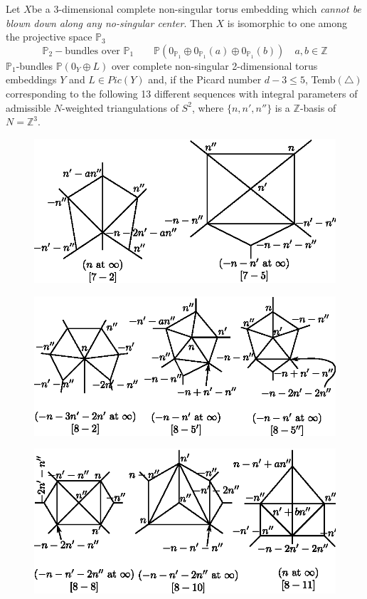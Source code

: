 \setcounter{theorem}{5}
\begin{theorem}\label{chap1:thm9.6}
Let $X$\pageoriginale be a 3-dimensional complete non-singular torus
embedding which \textit{cannot be blown down along any no-singular
  center}. Then $X$ is isomorphic to one among the projective space
$\mathbb{P}_3$  
$$
\mathbb{P}_2-\text{bundles over } \mathbb{P}_1 \qquad
\mathbb{P}(0_{\mathbb{P}_1} \oplus 0_{\mathbb{P}_1} (a) \oplus
0_{\mathbb{P}_1} (b))\quad a, b \in \mathbb{Z}
$$
$\mathbb{P}_1$-bundles
$\mathbb{P}(0_Y \oplus L)$ over complete non-singular 2-dimensional
torus embeddings $Y$ and $L \in Pic(Y)$ and, if the Picard number $d-3
\leq 5$, Temb$(\triangle)$ corresponding to the following 13
different sequences with integral parameters of admissible
$N$-weighted triangulations of $S^2$, where $\{n,  n', n''\}$ is a
$\mathbb{Z}$-basis of $N=\mathbb{Z}^3$. 
\begin{figure}[H]
\centering 
\includegraphics{vol58-fig/fig58-36.eps} 
\end{figure}
\begin{figure}[H]
\centering 
\includegraphics{vol58-fig/fig58-37.eps} 
\end{figure}
\pageoriginale
\begin{figure}[H]
\centering 
\includegraphics{vol58-fig/fig58-38.eps} 

\end{figure}
\end{theorem}
